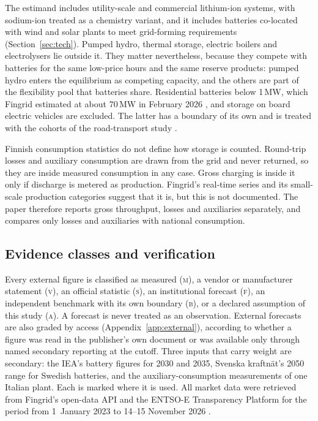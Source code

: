 \documentclass[11pt]{article}
\newcommand{\cls}[1]{\textsc{#1}}
\begin{document}
The estimand includes utility-scale and commercial lithium-ion systems, with sodium-ion treated as a chemistry variant, and it includes batteries co-located with wind and solar plants to meet grid-forming requirements (Section~\ref{sec:tech}).
Pumped hydro, thermal storage, electric boilers and electrolysers lie outside it.
They matter nevertheless, because they compete with batteries for the same low-price hours and the same reserve products: pumped hydro enters the equilibrium as competing capacity, and the others are part of the flexibility pool that batteries share.
Residential batteries below 1\,MW, which Fingrid estimated at about 70\,MW in February 2026 \citep{fingrid2026storage}, and storage on board electric vehicles are excluded. The latter has a boundary of its own and is treated with the cohorts of the road-transport study \citep{merilehto2026road}.

Finnish consumption statistics do not define how storage is counted.
Round-trip losses and auxiliary consumption are drawn from the grid and never returned, so they are inside measured consumption in any case.
Gross charging is inside it only if discharge is metered as production. Fingrid's real-time series and its small-scale production categories suggest that it is, but this is not documented.
The paper therefore reports gross throughput, losses and auxiliaries separately, and compares only losses and auxiliaries with national consumption.

\subsection{Evidence classes and verification}
Every external figure is classified as measured (\cls{m}), a vendor or manufacturer statement (\cls{v}), an official statistic (\cls{s}), an institutional forecast (\cls{f}), an independent benchmark with its own boundary (\cls{b}), or a declared assumption of this study (\cls{a}).
A forecast is never treated as an observation.
External forecasts are also graded by access (Appendix~\ref{app:external}), according to whether a figure was read in the publisher's own document or was available only through named secondary reporting at the cutoff.
Three inputs that carry weight are secondary: the IEA's battery figures for 2030 and 2035, Svenska kraftnät's 2050 range for Swedish batteries, and the auxiliary-consumption measurements of one Italian plant. Each is marked where it is used.
All market data were retrieved from Fingrid's open-data API and the ENTSO-E Transparency Platform for the period from 1~January 2023 to 14--15 November 2026 \citep{fingridopendata,entsoe2026transparency}.
\end{document}
